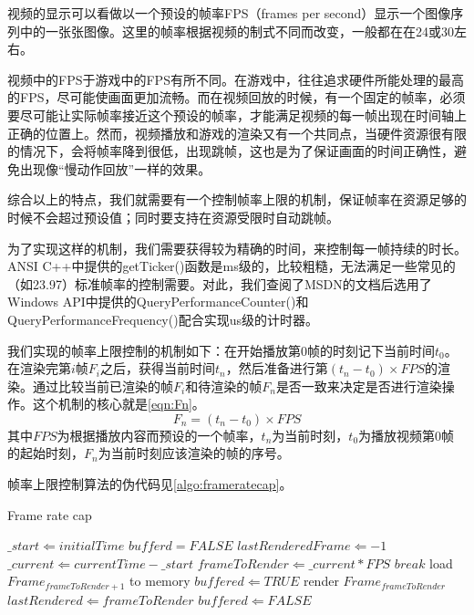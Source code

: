 视频的显示可以看做以一个预设的帧率FPS（frames per second）显示一个图像序列中的一张张图像。这里的帧率根据视频的制式不同而改变，一般都在在24或30左右。

视频中的FPS于游戏中的FPS有所不同。在游戏中，往往追求硬件所能处理的最高的FPS，尽可能使画面更加流畅。而在视频回放的时候，有一个固定的帧率，必须要尽可能让实际帧率接近这个预设的帧率，才能满足视频的每一帧出现在时间轴上正确的位置上。然而，视频播放和游戏的渲染又有一个共同点，当硬件资源很有限的情况下，会将帧率降到很低，出现跳帧，这也是为了保证画面的时间正确性，避免出现像“慢动作回放”一样的效果。

综合以上的特点，我们就需要有一个控制帧率上限的机制，保证帧率在资源足够的时候不会超过预设值；同时要支持在资源受限时自动跳帧。

为了实现这样的机制，我们需要获得较为精确的时间，来控制每一帧持续的时长。ANSI C++中提供的getTicker()函数是ms级的，比较粗糙，无法满足一些常见的（如23.97）标准帧率的控制需要。对此，我们查阅了MSDN的文档后选用了Windows API中提供的QueryPerformanceCounter()和QueryPerformanceFrequency()配合实现us级的计时器。

我们实现的帧率上限控制的机制如下：在开始播放第0帧的时刻记下当前时间$t_{0}$。在渲染完第$i$帧$F_{i}$之后，获得当前时间$t_{n}$，然后准备进行第$(t_{n}-t_{0})\times FPS$的渲染。通过比较当前已渲染的帧$F_{i}$和待渲染的帧$F_{n}$是否一致来决定是否进行渲染操作。这个机制的核心就是\autoref{eqn:Fn}。
\begin{equation}\label{eqn:Fn}
F_{n}=(t_{n}-t_{0})\times FPS
\end{equation}
其中$FPS$为根据播放内容而预设的一个帧率，$t_{n}$为当前时刻，$t_{0}$为播放视频第0帧的起始时刻，$F_{n}$为当前时刻应该渲染的帧的序号。

帧率上限控制算法的伪代码见\autoref{algo:frameratecap}。

\begin{algorithm}
\caption{Frame rate cap}
\label{algo:frameratecap}
\begin{algorithmic}[1]
	\STATE $\_start \Leftarrow initialTime$ %
	\STATE $bufferd = FALSE$
	\STATE $lastRenderedFrame \Leftarrow -1$
		\STATE $\_current \Leftarrow currentTime - \_start$ %
		\STATE $frameToRender \Leftarrow \_current * FPS$ %
			\STATE $break$ 
		\ENDIF
			\STATE load $Frame_{frameToRender+1}$ to memory
			\STATE $buffered \Leftarrow TRUE$
		\ENDIF
			\STATE render $Frame_{frameToRender}$
			\STATE $lastRendered \Leftarrow frameToRender$
			\STATE $buffered \Leftarrow FALSE$
		\ENDIF
	\ENDWHILE
\end{algorithmic}
\end{algorithm}


